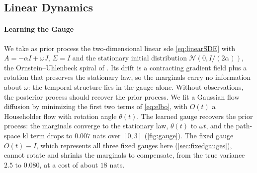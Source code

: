 \documentclass{article} %
\newcommand{\Norm}{\mathcal{N}}
\begin{document}
\subsection{Linear Dynamics}
\label{sec:exp:gauge}
\paragraph{Learning the Gauge}
We take as prior process the two-dimensional linear \gls{sde} \cref{eq:linearSDE} with $A = -\alpha I + \omega J$, $\Sigma = I$ and the stationary initial distribution $\Norm(0, I / (2 \alpha))$, the Ornstein--Uhlenbeck spiral of \citet{smith2026closing}. Its drift is a contracting gradient field plus a rotation that preserves the stationary law, so the marginals carry no information about $\omega$: the temporal structure lies in the gauge alone. Without observations, the posterior process should recover the prior process. We fit a Gaussian flow diffusion by minimizing the first two terms of \cref{eq:elbo}, with $O(t)$ a Householder flow with rotation angle $\theta(t)$. The learned gauge recovers the prior process: the marginals converge to the stationary law, $\theta(t)$ to $\omega t$, and the path-space \gls{kl} term drops to $0.007$ nats over $[0, 3]$ (\cref{fig:gauge}). The fixed gauge $O(t) \equiv I$, which represents all three fixed gauges here (\cref{sec:fixedgauges}), cannot rotate and shrinks the marginals to compensate, from the true variance $2.5$ to $0.080$, at a cost of about $18$ nats.
\end{document}
